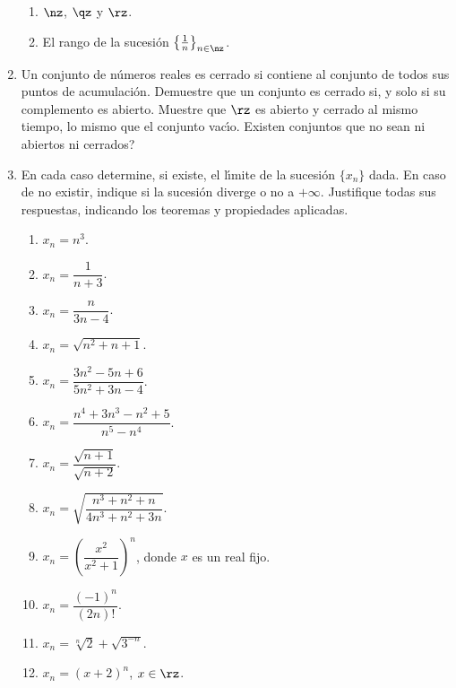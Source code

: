 \begin{enumerate}
\begin{enumerate}
\item $\nz$, $\qz$ y $\rz$.

\item El rango de la sucesi\'{o}n $\left\{  \frac{1}{n}\right\}  _{n\in\nz}$.
\end{enumerate}

\item Un conjunto de n\'{u}meros reales es%
cerrado si contiene al conjunto de todos sus puntos de acumulaci\'{o}n.
Demuestre que un conjunto es ce\-rrado si, y solo si su complemento es
abierto. Muestre que $\rz$ es abierto y cerrado al mismo tiempo, lo mismo que
el conjunto vac\'{\i}o. \textquestiondown Existen conjuntos que no sean ni
abiertos ni cerrados?

\item En cada caso determine, si existe, el l\'{\i}mite de la sucesi\'{o}n
$\{x_{n}\}$ dada. En caso de no existir, indique si la sucesi\'{o}n diverge o
no a $+\infty$. Justifique todas sus respuestas, indicando los teoremas y
propiedades aplicadas.

\begin{enumerate}
\item $x_{n}=n^{3}$.

\item $x_{n}=\dfrac{1}{n+3}$.

\item $x_{n}=\dfrac{n}{3n-4}$.

\item $x_{n}=\sqrt{n^{2}+n+1}$.

\item $x_{n}=\dfrac{3n^{2}-5n+6}{5n^{2}+3n-4}$.

\item $x_{n}=\dfrac{n^{4}+3n^{3}-n^{2}+5}{n^{5}-n^{4}}$.

\item $x_{n}=\dfrac{\sqrt{n+1}}{\sqrt{n+2}}$.

\item $x_{n}=\sqrt{\dfrac{n^{3}+n^{2}+n}{4n^{3}+n^{2}+3n}}$.

\item $x_{n}=\left(  \dfrac{x^{2}}{x^{2}+1}\right)  ^{n}$, donde $x$ es un
real fijo.

\item $x_{n}=\dfrac{(-1)^{n}}{(2n)!}$.

\item $x_{n}=\sqrt[n]{2}+\sqrt{3^{-n}}$.

\item $x_{n}=(x+2)^{n}$, $x\in\rz$.


\end{enumerate}
\end{enumerate}
